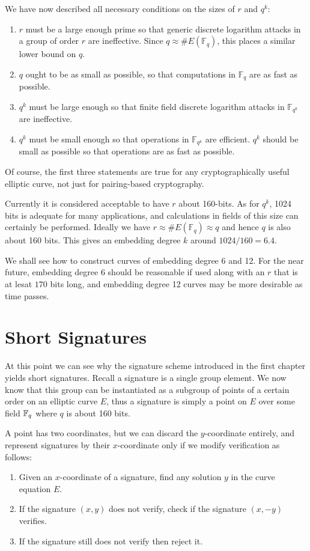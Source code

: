 We have now described all necessary conditions on the sizes of
$r$ and $q^k$:

\begin{enumerate}
\item
$r$ must be a large enough prime so that generic discrete logarithm attacks
in a group of order $r$ are ineffective. Since $q \approx \#E(\mathbb{F}_q)$,
this places a similar lower bound on $q$.
\item
$q$ ought to be as small as possible, so that computations in $\mathbb{F}_q$
are as fast as possible.
\item
$q^k$ must be large enough so that finite field discrete logarithm attacks
in $\mathbb{F}_{q^k}$ are ineffective.
\item
$q^k$ must be small enough so that operations in $\mathbb{F}_{q^k}$
are efficient. $q^k$ should be small as possible so that operations
are as fast as possible.
\end{enumerate}

Of course, the first three statements are true for any cryptographically
useful elliptic curve, not just for pairing-based cryptography.

Currently it is considered acceptable to have $r$ about 160-bits.
As for $q^k$, 1024 bits is adequate for many applications, and calculations
in fields of this size can certainly be performed.
Ideally we have $r \approx \#E(\mathbb{F}_q) \approx q$
and hence $q$ is also about 160 bits. This gives an
embedding degree $k$ around $1024 / 160 = 6.4$.

We shall see how to construct curves of embedding degree 6 and 12.
For the near future, embedding degree 6 should be reasonable if used along
with an $r$ that is at lesat $170$ bits long,
and embedding degree 12 curves may be more desirable as time passes.

\section { Short Signatures }

At this point we can see why the signature scheme introduced
in the first chapter
yields short signatures. Recall a signature is a single group element.
We now know that this group can be instantiated as a subgroup of points
of a certain order on an elliptic curve $E$, thus a signature is simply
a point on $E$ over some field $\mathbb{F}_q$ where $q$ is about 160 bits.

A point has two coordinates, but we can discard the $y$-coordinate entirely,
and represent signatures by their $x$-coordinate only if we modify
verification as follows:
\begin{enumerate}
\item
Given an $x$-coordinate of a signature, find any solution $y$
in the curve equation $E$.
\item
If the signature $(x,y)$ does not verify,
check if the signature $(x, -y)$ verifies.
\item
If the signature still does not verify then reject it.
\end{enumerate}

